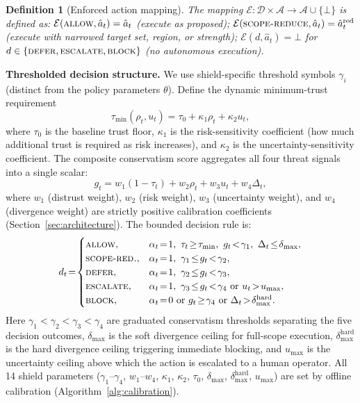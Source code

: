 \documentclass[10pt,journal,compsoc]{IEEEtran}
\newtheorem{definition}{Definition}
\begin{document}
\begin{definition}[Enforced action mapping]
\label{def:enforcement}
The mapping $\mathcal{E}: \mathcal{D} \times \mathcal{A} \to \mathcal{A} \cup \{\bot\}$ is defined as:
$\mathcal{E}(\textsc{allow}, \hat{a}_t) = \hat{a}_t$ (execute as proposed);
$\mathcal{E}(\textsc{scope-reduce}, \hat{a}_t) = \hat{a}_t^{\mathrm{red}}$ (execute with narrowed target set, region, or strength);
$\mathcal{E}(d, \hat{a}_t) = \bot$ for $d \in \{\textsc{defer}, \textsc{escalate}, \textsc{block}\}$ (no autonomous execution).
\end{definition}

\noindent\textbf{Thresholded decision structure.}
We use shield-specific threshold symbols $\gamma_i$ (distinct from the policy parameters $\theta$).
Define the dynamic minimum-trust requirement
\[
\tau_{\min}(\rho_t, u_t) = \tau_0 + \kappa_1 \rho_t + \kappa_2 u_t,
\]
where $\tau_0$ is the baseline trust floor, $\kappa_1$ is the risk-sensitivity coefficient (how much additional trust is required as risk increases), and $\kappa_2$ is the uncertainty-sensitivity coefficient.
The composite conservatism score aggregates all four threat signals into a single scalar:
\[
g_t = w_1 (1-\tau_t) + w_2 \rho_t + w_3 u_t + w_4 \Delta_t,
\]
where $w_1$ (distrust weight), $w_2$ (risk weight), $w_3$ (uncertainty weight), and $w_4$ (divergence weight) are strictly positive calibration coefficients (Section~\ref{sec:architecture}).
The bounded decision rule is:
{\small
\[
d_t \!=\!
\begin{cases}
\textsc{allow}, & \alpha_t\!=\!1,\ \tau_t \!\ge\! \tau_{\min},\ g_t \!<\! \gamma_1,\ \Delta_t \!\le\! \delta_{\max}, \\
\textsc{scope-red.}, & \alpha_t\!=\!1,\ \gamma_1 \!\le\! g_t \!<\! \gamma_2, \\
\textsc{defer}, & \alpha_t\!=\!1,\ \gamma_2 \!\le\! g_t \!<\! \gamma_3, \\
\textsc{escalate}, & \alpha_t\!=\!1,\ \gamma_3 \!\le\! g_t \!<\! \gamma_4\ \text{or}\ u_t \!>\! u_{\max}, \\
\textsc{block}, & \alpha_t\!=\!0\ \text{or}\ g_t \!\ge\! \gamma_4\ \text{or}\ \Delta_t \!>\! \delta_{\max}^{\mathrm{hard}}.
\end{cases}
\]
}
\noindent Here $\gamma_1 < \gamma_2 < \gamma_3 < \gamma_4$ are graduated conservatism thresholds separating the five decision outcomes, $\delta_{\max}$ is the soft divergence ceiling for full-scope execution, $\delta_{\max}^{\mathrm{hard}}$ is the hard divergence ceiling triggering immediate blocking, and $u_{\max}$ is the uncertainty ceiling above which the action is escalated to a human operator.
All 14 shield parameters ($\gamma_1$--$\gamma_4$, $w_1$--$w_4$, $\kappa_1$, $\kappa_2$, $\tau_0$, $\delta_{\max}$, $\delta_{\max}^{\mathrm{hard}}$, $u_{\max}$) are set by offline calibration (Algorithm~\ref{alg:calibration}).
\end{document}

